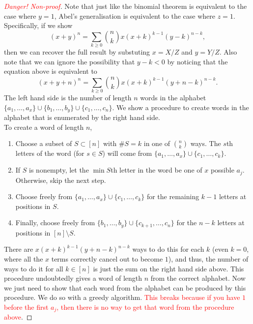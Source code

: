 \begin{proof}[\textcolor{red}{Danger! Non-proof}]
	Note that just like the binomial theorem is equivalent to the case where $y = 1$, Abel's generalisation is equivalent to the case where $z = 1$. Specifically, if we show
	 \[
		 (x + y)^{n} = \sum_{k \ge 0} \binom{n}{k} x (x + k)^{k - 1} (y - k)^{n - k},
	\]
	then we can recover the full result by substuting $x = X/Z$ and $y = Y/Z$. Also note that we can ignore the possibility that $y - k < 0$ by noticing that the equation above is equivalent to
	\[
		(x + y + n)^{n} = \sum_{k \ge 0} \binom{n}{k} x (x + k)^{k - 1} (y + n - k)^{n - k}.
	\]
	The left hand side is the number of length $n$ words in the alphabet $\{ a_{1}, \dots, a_{x} \} \cup \{ b_{1}, \dots, b_{y} \} \cup \{ c_{1}, \dots, c_{n} \}$. We show a procedure to create words in the alphabet that is enumerated by the right hand side. \\
	To create a word of length $n$, 
	\begin{enumerate}[label = (\arabic*)]
		\item Choose a subset of $S \subset [n]$ with $\# S = k$ in one of $\binom{n}{k}$ ways. The $s$th letters of the word (for $s \in S$) will come from $\{ a_{1}, \dots, a_{x} \} \cup \{ c_{1}, \dots, c_{k} \}$. 
		\item If $S$ is nonempty, let the $\min S$th letter in the word be one of $x$ possible $a_{j}$. Otherwise, skip the next step. 
		\item Choose freely from $\{ a_{1}, \dots, a_{x} \} \cup \{ c_{1}, \dots, c_{k} \}$ for the remaining $k - 1$ letters at positions in $S$.
		\item Finally, choose freely from $\{ b_{1}, \dots, b_{y} \} \cup \{ c_{k + 1}, \dots, c_{n} \}$ for the $n - k$ letters at positions in $[n] \setminus S$. 
\end{enumerate}
There are  $x(x + k)^{k - 1} (y + n - k)^{n - k}$ ways to do this for each $k$ (even $k = 0$, where all the $x$ terms correctly cancel out to become $1$), and thus, the number of ways to do it for all $k \in [n]$ is just the sum on the right hand side above. This procedure undoubtedly gives a word of length $n$ from the correct alphabet. Now we just need to show that each word from the alphabet can be produced by this procedure. We do so with a greedy algorithm. \textcolor{red}{This breaks because if you have $1$ before the first $a_{j}$, then there is no way to get that word from the procedure above}.

\end{proof}


